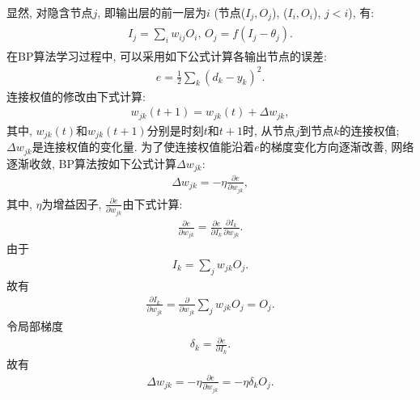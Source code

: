 显然, 对隐含节点$j$, 即输出层的前一层为$i$ (节点($I_j,O_j$), ($I_i,O_i$), $j<i$), 有:
\begin{align*}
  \begin{array}{ll}
        I_{j}=\sum\limits_{i} w_{i j} O_{i},\, O_{j}=f\left (I_{j}-\theta_{j}\right).
  \end{array}
\end{align*}
在BP算法学习过程中, 可以采用如下公式计算各输出节点的误差:
\begin{align*}
    e=\frac{1}{2} \sum_{k}\left (d_{k}-y_{k}\right)^{2}.
\end{align*}
连接权值的修改由下式计算:
\begin{align*}
    w_{j k} (t+1)=w_{j k} (t)+\Delta w_{j k},
\end{align*}
其中, $w_{jk}(t)$和$w_{jk} (t+1)$分别是时刻$t$和$t+1$时, 从节点$j$到节点$k$的连接权值; $\Delta w_{jk}$是连接权值的变化量.
为了使连接权值能沿着$e$的梯度变化方向逐渐改善, 网络逐渐收敛, BP算法按如下公式计算$\Delta w_{jk}$:
\begin{align*}
    \Delta w_{j k}=-\eta \frac{\partial e}{\partial w_{j k}},
\end{align*}
其中, $\eta$为增益因子, $\frac{\partial e}{\partial w_{j k}}$由下式计算:
\begin{align*}
    \frac{\partial e}{\partial w_{j k}}=\frac{\partial e}{\partial I_{k}} \frac{\partial I_{k}}{\partial w_{jk}}.
\end{align*}
由于
\begin{align*}
    I_{k}=\sum_{j} w_{j k} O_{j}.
\end{align*}
故有
\begin{align*}
    \frac{\partial I_{k}}{\partial w_{j k}}=\frac{\partial}{\partial w_{j k}} \sum_{j} w_{j k} O_{j}=O_{j}.
\end{align*}
令局部梯度
\begin{align*}
    \delta_{k}=\frac{\partial e}{\partial I_{k}}.
\end{align*}
故有
\begin{align*}
    \Delta w_{j k}=-\eta \frac{\partial e}{\partial w_{j k}}=-\eta \delta_{k} O_{j}.
\end{align*}
